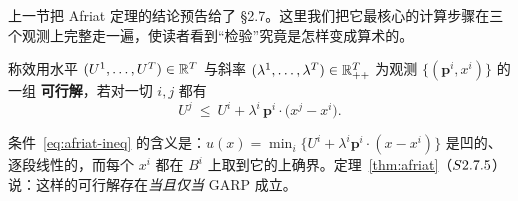 上一节把 Afriat 定理的结论预告给了 \S2.7。这里我们把它最核心的计算步骤在三个观测上完整走一遍，使读者看到“检验”究竟是怎样变成算术的。

\begin{definition}\label{def:afriat-ineq}
称效用水平 $(U^{1},\dots,U^{T})\in\R^{T}$ 与斜率 $(\lambda^{1},\dots,\lambda^{T})\in\R_{++}^{T}$ 为观测 $\{(\boldsymbol{p}^{i},x^{i})\}$ 的一组 \textbf{可行解}，若对一切 $i,j$ 都有
\begin{equation}\label{eq:afriat-ineq}
U^{j}\ \le\ U^{i}+\lambda^{i}\,\boldsymbol{p}^{i}\cdot\bigl(x^{j}-x^{i}\bigr).
\end{equation}
\end{definition}

条件~\eqref{eq:afriat-ineq} 的含义是：$u(x)=\min_{i}\bigl\{U^{i}+\lambda^{i}\boldsymbol{p}^{i}\cdot(x-x^{i})\bigr\}$ 是凹的、逐段线性的，而每个 $x^{i}$ 都在 $B^{i}$ 上取到它的上确界。定理~\ref{thm:afriat}（$\S2.7.5$）说：这样的可行解存在\emph{当且仅当} GARP 成立。

